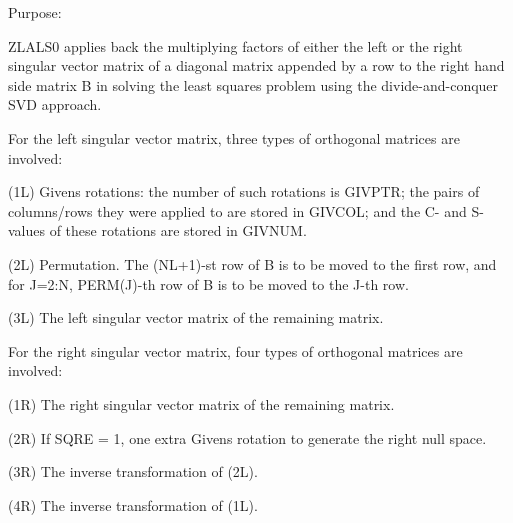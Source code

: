  \begin{DoxyParagraph}{Purpose\+: }
\begin{DoxyVerb} ZLALS0 applies back the multiplying factors of either the left or the
 right singular vector matrix of a diagonal matrix appended by a row
 to the right hand side matrix B in solving the least squares problem
 using the divide-and-conquer SVD approach.

 For the left singular vector matrix, three types of orthogonal
 matrices are involved:

 (1L) Givens rotations: the number of such rotations is GIVPTR; the
      pairs of columns/rows they were applied to are stored in GIVCOL;
      and the C- and S-values of these rotations are stored in GIVNUM.

 (2L) Permutation. The (NL+1)-st row of B is to be moved to the first
      row, and for J=2:N, PERM(J)-th row of B is to be moved to the
      J-th row.

 (3L) The left singular vector matrix of the remaining matrix.

 For the right singular vector matrix, four types of orthogonal
 matrices are involved:

 (1R) The right singular vector matrix of the remaining matrix.

 (2R) If SQRE = 1, one extra Givens rotation to generate the right
      null space.

 (3R) The inverse transformation of (2L).

 (4R) The inverse transformation of (1L).\end{DoxyVerb}
 
\end{DoxyParagraph}


